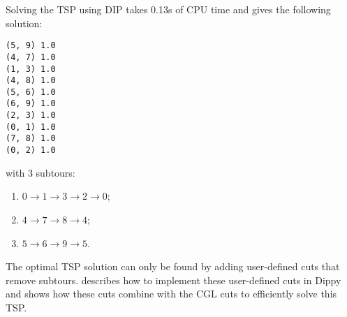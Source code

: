 Solving the \ac{TSP} using \ac{DIP} takes 0.13s of CPU time and gives the following solution:
\begin{verbatim}
(5, 9) 1.0
(4, 7) 1.0
(1, 3) 1.0
(4, 8) 1.0
(5, 6) 1.0
(6, 9) 1.0
(2, 3) 1.0
(0, 1) 1.0
(7, 8) 1.0
(0, 2) 1.0
\end{verbatim}
with 3 subtours:
\begin{enumerate}
\item $0 \rightarrow 1 \rightarrow 3 \rightarrow 2 \rightarrow 0$;
\item $4 \rightarrow 7 \rightarrow 8 \rightarrow 4$;
\item $5 \rightarrow 6 \rightarrow 9 \rightarrow 5$.
\end{enumerate}

The optimal \ac{TSP} solution can only be found by adding user-defined cuts that remove subtours.  describes how to implement these user-defined cuts in Dippy and shows how these cuts combine with the \ac{CGL} cuts to efficiently solve this \ac{TSP}.
